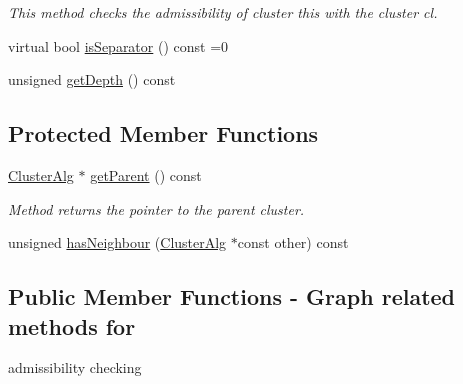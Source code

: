\begin{DoxyCompactItemize}
\begin{DoxyCompactList}\small\item\em \-This method checks the admissibility of cluster this with the cluster cl. \end{DoxyCompactList}\item 
virtual bool \hyperlink{classClusterAlg_abe3332e66bad89111412fb0fa7928c66}{is\-Separator} () const =0
\item 
unsigned \hyperlink{classClusterAlg_ac21ad0586cca3b05c1df94fa66f224e4}{get\-Depth} () const 
\end{DoxyCompactItemize}
\subsection*{\-Protected \-Member \-Functions}
\begin{DoxyCompactItemize}
\item 
\hyperlink{classClusterAlg}{\-Cluster\-Alg} $\ast$ \hyperlink{classClusterAlg_a7b3c0f12a96e20016135ae5b98c100db}{get\-Parent} () const 
\begin{DoxyCompactList}\small\item\em \-Method returns the pointer to the parent cluster. \end{DoxyCompactList}\item 
unsigned \hyperlink{classClusterAlg_a1010355ccb56db6bc68b258e94c4a765}{has\-Neighbour} (\hyperlink{classClusterAlg}{\-Cluster\-Alg} $\ast$const other) const 
\end{DoxyCompactItemize}
\subsection*{\-Public \-Member \-Functions -\/ \-Graph related methods for}
\label{_amgrpd43883f7a3f1c1aa575f47a69a7c8e7b}%
 admissibility checking

